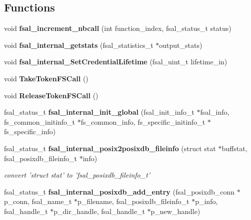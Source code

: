 \subsection*{Functions}
\begin{CompactItemize}
\item 
void {\bf fsal\_\-increment\_\-nbcall} (int function\_\-index, fsal\_\-status\_\-t status)
\item 
void {\bf fsal\_\-internal\_\-getstats} (fsal\_\-statistics\_\-t $\ast$output\_\-stats)
\item 
void {\bf fsal\_\-internal\_\-Set\-Credential\-Lifetime} (fsal\_\-uint\_\-t lifetime\_\-in)
\item 
void {\bf Take\-Token\-FSCall} ()
\item 
void {\bf Release\-Token\-FSCall} ()\label{fsal__internal_8c_a18}

\item 
fsal\_\-status\_\-t {\bf fsal\_\-internal\_\-init\_\-global} (fsal\_\-init\_\-info\_\-t $\ast$fsal\_\-info, fs\_\-common\_\-initinfo\_\-t $\ast$fs\_\-common\_\-info, fs\_\-specific\_\-initinfo\_\-t $\ast$fs\_\-specific\_\-info)\label{fsal__internal_8c_a19}

\item 
fsal\_\-status\_\-t {\bf fsal\_\-internal\_\-posix2posixdb\_\-fileinfo} (struct stat $\ast$buffstat, fsal\_\-posixdb\_\-fileinfo\_\-t $\ast$info)
\begin{CompactList}\small\item\em convert 'struct stat' to 'fsal\_\-posixdb\_\-fileinfo\_\-t' \item\end{CompactList}\item 
fsal\_\-status\_\-t {\bf fsal\_\-internal\_\-posixdb\_\-add\_\-entry} (fsal\_\-posixdb\_\-conn $\ast$p\_\-conn, fsal\_\-name\_\-t $\ast$p\_\-filename, fsal\_\-posixdb\_\-fileinfo\_\-t $\ast$p\_\-info, fsal\_\-handle\_\-t $\ast$p\_\-dir\_\-handle, fsal\_\-handle\_\-t $\ast$p\_\-new\_\-handle)\label{fsal__internal_8c_a21}


\end{CompactItemize}
